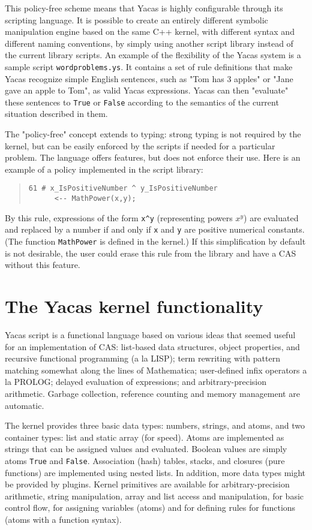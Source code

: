 \documentclass{llncs}
\begin{document}
This policy-free scheme means that Yacas is highly configurable through its
scripting language. It is possible to create an entirely different symbolic
manipulation engine based on the same C++ kernel, with different syntax and
different naming  conventions, by simply using another script library instead
of the current library scripts. An example of the flexibility of the Yacas
system is a sample script \texttt{wordproblems.ys}. It contains a set of rule
definitions that make Yacas recognize simple English sentences, such as "Tom
has 3 apples" or "Jane gave an apple to Tom", as valid Yacas expressions. Yacas
can then "evaluate" these sentences to \texttt{True} or \texttt{False} according to
the semantics of the current situation described in them.


The "policy-free" concept extends to typing: strong typing is not required by
the kernel, but can be easily enforced by the  scripts if needed for a
particular problem. The language offers features, but does not enforce their
use.
Here is an example of a policy implemented in the script library:


\begin{quote}\small\begin{verbatim}
61 # x_IsPositiveNumber ^ y_IsPositiveNumber 
      <-- MathPower(x,y);
\end{verbatim}\end{quote}
By this rule, expressions of the form \verb|x^y| (representing powers $x ^{y}$) are
evaluated and replaced by a number if and only if \texttt{x} and \texttt{y} are positive
numerical constants. (The function \texttt{MathPower} is  defined in the kernel.) If
this simplification by default is not desirable, the user could erase this rule
from the library
and have a CAS without this feature.


\section{The Yacas kernel functionality}
Yacas script is a functional language based on various ideas that seemed useful
for an implementation of CAS: list-based data structures, object properties,
and recursive functional programming (a la LISP); term rewriting \cite{BN98} with
pattern matching somewhat along the lines of Mathematica; user-defined infix
operators a la PROLOG; delayed evaluation of expressions; and
arbitrary-precision arithmetic.  Garbage collection, reference counting and
memory management are automatic.


The kernel provides three basic data types: numbers,
strings, and atoms, and two container types: list and static array (for speed).
Atoms are implemented as strings that can be assigned values and evaluated.
Boolean values are simply atoms \texttt{True} and \texttt{False}. Association (hash) tables,
stacks, and closures (pure functions) are implemented using nested lists. In
addition, more data types might be provided by plugins. Kernel primitives are
available for arbitrary-precision arithmetic, string manipulation, array and
list access and manipulation, for basic control flow, for assigning variables (atoms) and for defining rules for functions (atoms with a function syntax).
\end{document}
